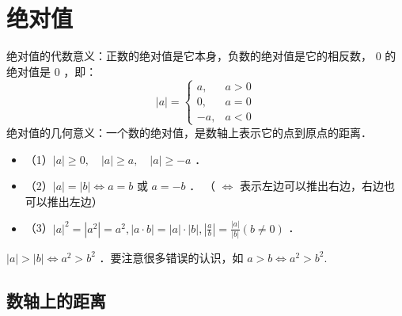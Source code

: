 \section{绝对值}

\begin{definition}
    绝对值的代数意义：正数的绝对值是它本身，负数的绝对值是它的相反数， 0 的绝对值是 0 ，即：
    $$
        |a|= \begin{cases}a, & a>0 \\ 0, & a=0 \\ -a, & a<0\end{cases}
    $$
    绝对值的几何意义：一个数的绝对值，是数轴上表示它的点到原点的距离．
\end{definition}

\begin{theorem}[绝对值的性质]
    \begin{itemize}
        \item （1）$|a| \geqslant 0, \quad|a| \geqslant a, \quad|a| \geqslant-a$ ．
        \item （2）$|a|=|b| \Leftrightarrow a=b$ 或 $a=-b$ ．
              （ $\Leftrightarrow$ 表示左边可以推出右边，右边也可以推出左边）
        \item （3）$|a|^2=\left|a^2\right|=a^2,|a \cdot b|=|a| \cdot|b|,\left|\frac{a}{b}\right|=\frac{|a|}{|b|}(b \neq 0)$ ．
    \end{itemize}
\end{theorem}

\begin{warning}
    $|a|>|b| \Leftrightarrow a^2>b^2$ ．要注意很多错误的认识，如 $a>b \Leftrightarrow a^2>b^2$.
\end{warning}

\subsection{数轴上的距离}

